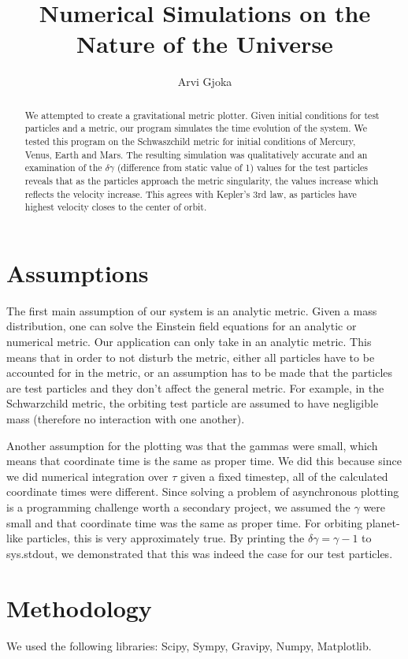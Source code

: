 \documentclass[12pt]{article}
\title{Numerical Simulations on the Nature of the Universe}
\date{}
\author{Arvi Gjoka}
\begin{document}
\maketitle

\begin{abstract}
We attempted to create a gravitational metric plotter. Given initial conditions for test particles and a metric, our program simulates the time evolution of the system. We tested this program on the Schwaszchild metric for initial conditions of Mercury, Venus, Earth and Mars. The resulting simulation was qualitatively accurate and an examination of the $\delta \gamma$ (difference from static value of 1) values for  the test particles reveals that as the particles approach the metric singularity, the values increase which reflects the velocity increase. This agrees with Kepler's 3rd law, as particles have highest velocity closes to the center of orbit.
\end{abstract}

\section*{Assumptions}
The first main assumption of our system is an analytic metric. Given a mass distribution, one can solve the Einstein field equations for an analytic or numerical metric. Our application can only take in an analytic metric. This means that in order to not disturb the metric, either all particles have to be accounted for in the metric, or an assumption has to be made that the particles are test particles and they don't affect the general metric. For example, in the Schwarzchild metric, the orbiting test particle are assumed to have negligible mass (therefore no interaction with one another).

Another assumption for the plotting was that the gammas were small, which means that coordinate time is the same as proper time. We did this because since we did numerical integration over $\tau$ given a fixed timestep, all of the calculated coordinate times were different. Since solving a problem of asynchronous plotting is a programming challenge worth a secondary project, we assumed the $\gamma$ were small and that coordinate time was the same as proper time. For orbiting planet-like particles, this is very approximately true. By printing the $\delta \gamma = \gamma - 1$ to sys.stdout, we demonstrated that this was indeed the case for our test particles.

\section*{Methodology}
We used the following libraries: Scipy, Sympy, Gravipy, Numpy, Matplotlib.
\end{document}

